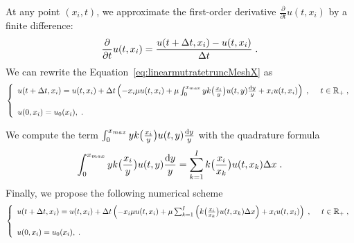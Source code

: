 \documentclass[11pt]{amsart}
\begin{document}
At any point $(x_i, t)$, we approximate the first-order derivative $\frac{\partial}{\partial t}u(t,x_i)$ by a finite difference:
$$\frac{\partial}{\partial t}u(t,x_i) = \frac{u(t+\Delta t,x_i) - u(t,x_i)}{\Delta t}
\; .$$
We can rewrite the Equation~\eqref{eq:linearmutratetruncMeshX} as
\begin{equation}\left\{
    \begin{array}{ll}
        u(t+\Delta t,x_i) = u(t,x_i) + \Delta t \left(- x_i\mu u(t,x_i) + \mu \int_{0}^{x_{max}} y k\big( \frac{x_i}{y}\big) u(t,y) \frac{\mathrm dy}{y} + x_iu(t,x_i) \right)
	\; , \enspace
	& t \in \mathbb{R}_+ \; ,
	\\ \\
	u(0, x_i) = u_0(x_i),
	\; .
    \end{array}
	\right.
    \label{eq:linearmutratetruncMeshX}
\end{equation}

We compute the term $\int_{0}^{x_{max}} y k\big( \frac{x_i}{y}\big) u(t,y) \frac{\mathrm dy}{y}$ with the quadrature formula
$$ \int_{0}^{x_{max}} y k\big( \frac{x_i}{y}\big) u(t,y) \frac{\mathrm dy}{y}
= \sum_{k = 1}^I k \big( \frac{x_i}{x_k}\big) u(t,x_k) \Delta x \; .
$$ 
Finally, we propose the following numerical scheme
\begin{equation}\left\{
    \begin{array}{ll}
        u(t+\Delta t,x_i) = u(t,x_i) + \Delta t \left(- x_i\mu u(t,x_i) + \mu \sum_{k = 1}^I \left(k \big( \frac{x_i}{x_k}\big) u(t,x_k) \Delta x \right) + x_iu(t,x_i) \right)
	\; , \enspace
	& t \in \mathbb{R}_+ \; ,
	\\ \\
	u(0, x_i) = u_0(x_i),
	\; .
    \end{array}
	\right.
    \label{eq:numericalScheme}
\end{equation}






\end{document}
